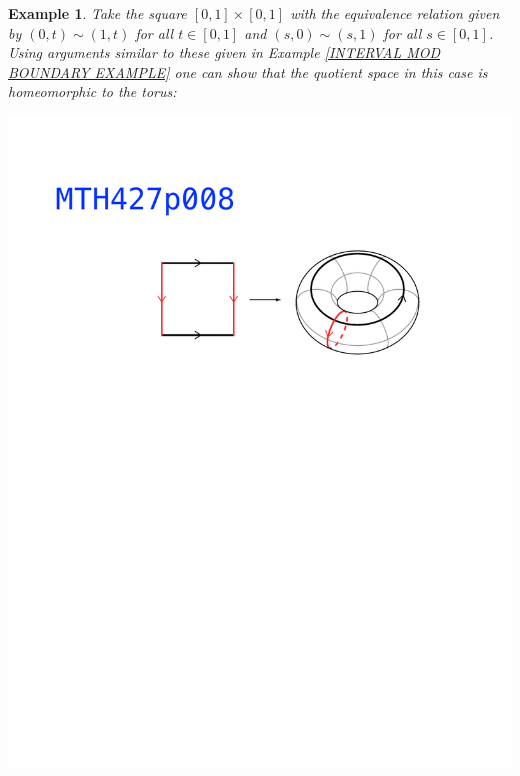 \documentclass[11pt, letterpaper, oneside]{report}
\theoremstyle{pplain}
\newtheorem{ITERMVALUE THM}[theorem]{Intermediate Value Theorem}
\newtheorem{HEINEBOREL THM}[theorem]{Heine-Borel Theorem}
\newtheorem{UMETR THM}[theorem]{Urysohn Metrization Theorem}
\newtheorem{UMETR2 THM}[theorem]{Urysohn Metrization Theorem (v.2)}
\theoremstyle{ddefinition}
\newtheorem{example}[theorem]{Example}
\theoremstyle{nnn}
\newtheorem{TDA NN}[theorem]{Topological Data Analysis. }
\theoremstyle{eexercise}
\begin{document}
\begin{example}
Take the square $[0,1]\times [0,1]$ with the equivalence relation given by $(0,t)\sim (1, t)$
for all $t\in [0,1]$ and $(s, 0)\sim (s,1)$ for all $s\in [0,1]$. Using arguments similar to these given in 
Example \ref{INTERVAL MOD BOUNDARY EXAMPLE} one can show that the quotient space in this 
case is homeomorphic to the torus:

{{\includegraphics[width=\textwidth, trim=0mm 176mm 0mm 57mm, clip]{pictures/MTH427p008.pdf}}   }

\end{example}
\end{document}

